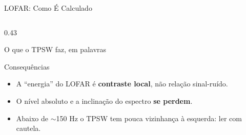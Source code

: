 \documentclass[aspectratio=169]{beamer}
\begin{document}
\begin{frame}{LOFAR: Como É Calculado}
\begin{columns}[T]
\begin{column}{0.43\textwidth}
\begin{block}{\small O que o TPSW faz, em palavras}
            \end{block}
            \begin{block}{\small Consequências}
                \scriptsize
                \begin{itemize}
                    \setlength{\itemsep}{1pt}
                    \item A ``energia'' do LOFAR é \textbf{contraste local}, não relação sinal-ruído.
                    \item O nível absoluto e a inclinação do espectro \textbf{se perdem}.
                    \item Abaixo de $\sim$150 Hz o TPSW tem pouca vizinhança à esquerda: ler com cautela.
                \end{itemize}
            \end{block}
        \end{column}
    \end{columns}
\end{frame}
\end{document}
